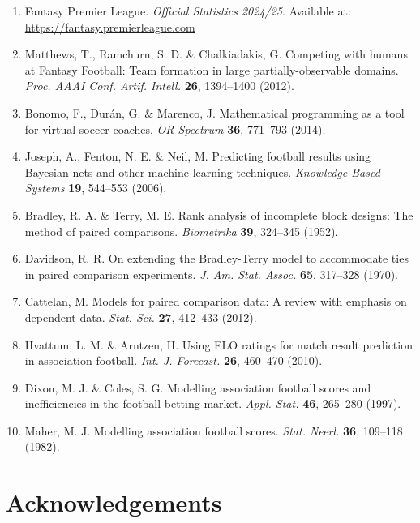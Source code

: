 \documentclass[10pt,a4paper]{article}
\begin{document}
\small
\begin{enumerate}
\item Fantasy Premier League. \textit{Official Statistics 2024/25}. Available at: \url{https://fantasy.premierleague.com}

\item Matthews, T., Ramchurn, S. D. \& Chalkiadakis, G. Competing with humans at Fantasy Football: Team formation in large partially-observable domains. \textit{Proc. AAAI Conf. Artif. Intell.} \textbf{26}, 1394–1400 (2012).

\item Bonomo, F., Durán, G. \& Marenco, J. Mathematical programming as a tool for virtual soccer coaches. \textit{OR Spectrum} \textbf{36}, 771–793 (2014).

\item Joseph, A., Fenton, N. E. \& Neil, M. Predicting football results using Bayesian nets and other machine learning techniques. \textit{Knowledge-Based Systems} \textbf{19}, 544–553 (2006).

\item Bradley, R. A. \& Terry, M. E. Rank analysis of incomplete block designs: The method of paired comparisons. \textit{Biometrika} \textbf{39}, 324–345 (1952).

\item Davidson, R. R. On extending the Bradley-Terry model to accommodate ties in paired comparison experiments. \textit{J. Am. Stat. Assoc.} \textbf{65}, 317–328 (1970).

\item Cattelan, M. Models for paired comparison data: A review with emphasis on dependent data. \textit{Stat. Sci.} \textbf{27}, 412–433 (2012).

\item Hvattum, L. M. \& Arntzen, H. Using ELO ratings for match result prediction in association football. \textit{Int. J. Forecast.} \textbf{26}, 460–470 (2010).

\item Dixon, M. J. \& Coles, S. G. Modelling association football scores and inefficiencies in the football betting market. \textit{Appl. Stat.} \textbf{46}, 265–280 (1997).

\item Maher, M. J. Modelling association football scores. \textit{Stat. Neerl.} \textbf{36}, 109–118 (1982).
\end{enumerate}

\section*{Acknowledgements}
\end{document}
